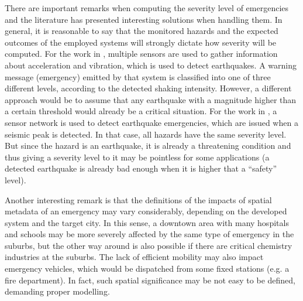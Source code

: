 \begin{refsection}
\begin{itemize}
\end{itemize}

There are important remarks when computing the severity level of emergencies and the literature has presented interesting solutions when handling them. In general, it is reasonable to say that the monitored hazards and the expected outcomes of the employed systems will strongly dictate how severity will be computed. For the work in \cite{iotEarthquake2}, multiple sensors are used to gather information about acceleration and vibration, which is used to detect earthquakes. A warning message (emergency) emitted by that system is classified into one of three different levels, according to the detected shaking intensity. However, a different approach would be to assume that any earthquake with a magnitude higher than a certain threshold would already be a critical situation. For the work in \cite{iotEarthquake3}, a sensor network is used to detect earthquake emergencies, which are issued when a seismic peak is detected. In that case, all hazards have the same severity level. But since the hazard is an earthquake, it is already a threatening condition and thus giving a severity level to it may be pointless for some applications (a detected earthquake is already bad enough when it is higher that a ``safety'' level).

Another interesting remark is that the definitions of the impacts of spatial metadata of an emergency may vary considerably, depending on the developed system and the target city. In this sense, a downtown area with many hospitals and schools may be more severely affected by the same type of emergency in the suburbs, but the other way around is also possible if there are critical chemistry industries at the suburbs. The lack of efficient mobility may also impact emergency vehicles, which would be dispatched from some fixed stations (e.g. a fire department). In fact, such spatial significance may be not easy to be defined, demanding proper modelling.


\end{refsection}
